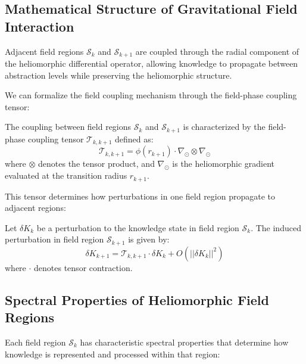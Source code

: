 \subsection{Mathematical Structure of Gravitational Field Interaction}

\begin{corollary}
Adjacent field regions $\mathcal{S}_k$ and $\mathcal{S}_{k+1}$ are coupled through the radial component of the heliomorphic differential operator, allowing knowledge to propagate between abstraction levels while preserving the heliomorphic structure.
\end{corollary}

We can formalize the field coupling mechanism through the field-phase coupling tensor:

\begin{definition}
The coupling between field regions $\mathcal{S}_k$ and $\mathcal{S}_{k+1}$ is characterized by the field-phase coupling tensor $\mathcal{T}_{k,k+1}$ defined as:
\begin{equation}
\mathcal{T}_{k,k+1} = \phi(r_{k+1}) \cdot \nabla_{\odot} \otimes \nabla_{\odot}
\end{equation}
where $\otimes$ denotes the tensor product, and $\nabla_{\odot}$ is the heliomorphic gradient evaluated at the transition radius $r_{k+1}$.
\end{definition}

This tensor determines how perturbations in one field region propagate to adjacent regions:

\begin{theorem}
Let $\delta K_k$ be a perturbation to the knowledge state in field region $\mathcal{S}_k$. The induced perturbation in field region $\mathcal{S}_{k+1}$ is given by:
\begin{equation}
\delta K_{k+1} = \mathcal{T}_{k,k+1} \cdot \delta K_k + O(||\delta K_k||^2)
\end{equation}
where $\cdot$ denotes tensor contraction.
\end{theorem}

\subsection{Spectral Properties of Heliomorphic Field Regions}

Each field region $\mathcal{S}_k$ has characteristic spectral properties that determine how knowledge is represented and processed within that region:

